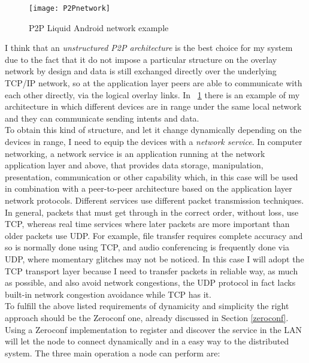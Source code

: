 \begin{figure}[h]
\centering
\texttt{[image: P2Pnetwork]}
\caption{P2P Liquid Android network example}
\label{fig:4.3}
\end{figure}
I think that an \textit{unstructured P2P architecture} is the best choice for my system due to the fact that it do not impose a particular structure on the overlay network by design and data is still exchanged directly over the underlying TCP/IP network, so at the application layer peers are able to communicate with each other directly, via the logical overlay links. In \figurename~\ref{fig:4.3} there is an example of my architecture in which different devices are in range under the same local network and they can communicate sending intents and data.\\
To obtain this kind of structure, and let it change dynamically depending on the devices in range, I need to equip the devices with a \textit{network service}. In computer networking, a network service is an application running at the network application layer and above, that provides data storage, manipulation, presentation, communication or other capability which, in this case will be used in combination with a peer-to-peer architecture based on the application layer network protocols. Different services use different packet transmission techniques. In general, packets that must get through in the correct order, without loss, use TCP, whereas real time services where later packets are more important than older packets use UDP. For example, file transfer requires complete accuracy and so is normally done using TCP, and audio conferencing is frequently done via UDP, where momentary glitches may not be noticed. In this case I will adopt the TCP transport layer because I need to transfer packets in reliable way, as much as possible, and also avoid network congestions, the UDP protocol in fact lacks built-in network congestion avoidance while TCP has it.\\
To fulfill the above listed requirements of dynamicity and simplicity the right approach should be the Zeroconf one, already discussed in Section \ref{zeroconf}. Using a Zeroconf implementation to register and discover the service in the LAN will let the node to connect dynamically and in a easy way to the distributed system. The three main operation a node can perform are:
